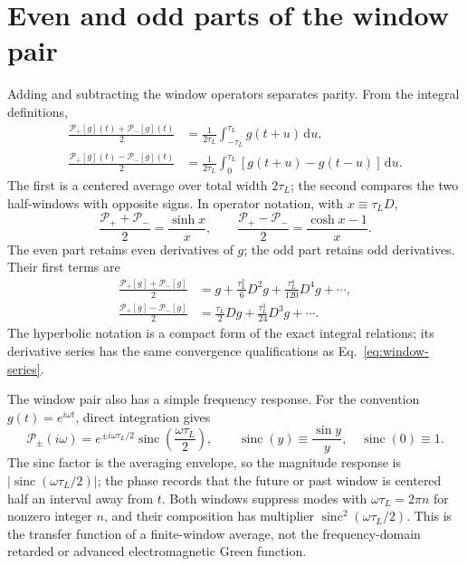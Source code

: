 \documentclass[12pt]{article}
\begin{document}
\section{Even and odd parts of the window pair}

Adding and subtracting the window operators separates parity. From the integral definitions,
\begin{align}
  \frac{\mathcal{P}_{+}[g](t)+\mathcal{P}_{-}[g](t)}{2}
  &=\frac{1}{2\tau_L}\int_{-\tau_L}^{\tau_L}g(t+u)\,\mathrm{d}u,
  \label{eq:centered-window}\\
  \frac{\mathcal{P}_{+}[g](t)-\mathcal{P}_{-}[g](t)}{2}
  &=\frac{1}{2\tau_L}\int_0^{\tau_L}
  \left[g(t+u)-g(t-u)\right] \,\mathrm{d}u.
  \label{eq:odd-window}
\end{align}
The first is a centered average over total width $2\tau_L$; the second compares the two half-windows with opposite signs. In operator notation, with $x\equiv \tau_LD$,
\begin{equation}
  \frac{\mathcal{P}_{+}+\mathcal{P}_{-}}{2}
  =\frac{\sinh x}{x},
  \qquad
  \frac{\mathcal{P}_{+}-\mathcal{P}_{-}}{2}
  =\frac{\cosh x-1}{x}.
  \label{eq:hyperbolic-window-split}
\end{equation}
The even part retains even derivatives of $g$; the odd part retains odd derivatives. Their first terms are
\begin{align}
  \frac{\mathcal{P}_{+}[g]+\mathcal{P}_{-}[g]}{2}
  &=g+\frac{\tau_L^2}{6}D^2g
  +\frac{\tau_L^4}{120}D^4g+\cdots,\\
  \frac{\mathcal{P}_{+}[g]-\mathcal{P}_{-}[g]}{2}
  &=\frac{\tau_L}{2}Dg
  +\frac{\tau_L^3}{24}D^3g+\cdots.
\end{align}
The hyperbolic notation is a compact form of the exact integral relations; its derivative series has the same convergence qualifications as Eq.~\eqref{eq:window-series}.

The window pair also has a simple frequency response. For the convention $g(t)=e^{i\omega t}$, direct integration gives
\begin{equation}
  \mathcal{P}_{\pm}(i\omega)
  =e^{\pm i\omega \tau_L/2}
  \operatorname{sinc}\!\left(\frac{\omega \tau_L}{2}\right),
  \qquad
  \operatorname{sinc}(y)\equiv\frac{\sin y}{y},
  \quad \operatorname{sinc}(0)\equiv1.
  \label{eq:window-frequency-response}
\end{equation}
The sinc factor is the averaging envelope, so the magnitude response is $|\operatorname{sinc}(\omega \tau_L/2)|$; the phase records that the future or past window is centered half an interval away from $t$. Both windows suppress modes with $\omega \tau_L=2\pi n$ for nonzero integer $n$, and their composition has multiplier $\operatorname{sinc}^2(\omega \tau_L/2)$. This is the transfer function of a finite-window average, not the frequency-domain retarded or advanced electromagnetic Green function.
\end{document}
